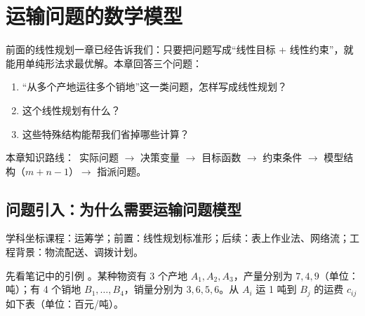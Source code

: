 \section{运输问题的数学模型}
\noindent 前面的线性规划一章已经告诉我们：只要把问题写成“线性目标 + 线性约束”，就能用单纯形法求最优解。本章回答三个问题：
\begin{enumerate}[label=\arabic*.]
\item “从多个产地运往多个销地”这一类问题，怎样写成线性规划？
\item 这个线性规划有什么？
\item 这些特殊结构能帮我们省掉哪些计算？
\end{enumerate}
\noindent\textsf{\color{blue2}本章知识路线：}\ 实际问题 $\to$ 决策变量 $\to$ 目标函数 $\to$ 约束条件 $\to$ 模型结构（$m+n-1$）$\to$ 指派问题。

\subsection{问题引入：为什么需要运输问题模型}
\noindent\textsf{\color{blue2}学科坐标}\quad 课程：运筹学；前置：线性规划标准形；后续：表上作业法、网络流；工程背景：物流配送、调拨计划。

先看笔记中的引例 \orig。某种物资有 3 个产地 $A_1,A_2,A_3$，产量分别为 $7,4,9$（单位：吨）；有 4 个销地 $B_1,\dots,B_4$，销量分别为 $3,6,5,6$。从 $A_i$ 运 1 吨到 $B_j$ 的运费 $c_{ij}$ 如下表（单位：百元/吨）。

